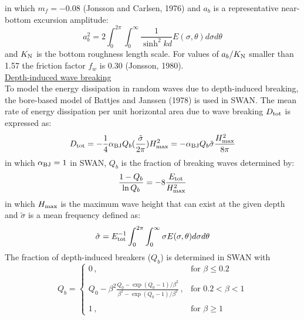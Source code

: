 \documentclass[12pt]{book}
\begin{document}
in which $m_f = -0.08$ (Jonsson and Carlsen, 1976) and $a_b$ is a representative near-bottom excursion
amplitude:
\begin{equation}
  a^2_{b} = 2\int_{0}^{2\pi} \int_{0}^{\infty} \frac{1}{\sinh^2 kd} E(\sigma,\theta) d\sigma d\theta
  \label{eq3-21}
\end{equation}
and $K_{\rm N}$ is the bottom roughness length scale. For values of $a_b/K_{\rm N}$ smaller than 1.57 the
friction factor $f_w$ is 0.30 (Jonsson, 1980).
\nocite{Jon76C,Jon80}
\\[2ex]
\noindent
\underline{Depth-induced wave breaking}\\[2ex]
To model the energy dissipation in random waves due to depth-induced breaking, the bore-based model
of Battjes and Janssen (1978) is used in SWAN. The mean rate of energy dissipation per unit horizontal
area due to wave breaking $D_{\rm tot}$ is expressed as:
\begin{equation}
  D_{\rm tot} = - \frac{1}{4} \alpha_{\rm BJ} Q_b (\frac{\tilde{\sigma}}{2\pi}) H^2_{\rm max}
              = - \alpha_{\rm BJ} Q_b \tilde{\sigma} \frac{H^2_{\rm max}}{8\pi}
  \label{eq3-22}
\end{equation}
in which $\alpha_{\rm BJ} = 1$ in SWAN, $Q_b$ is the fraction of breaking waves determined by:
\begin{equation}
  \frac{1 - Q_b}{\ln Q_b} = -8 \frac{E_{\rm tot}}{H_{\rm max}^2}
  \label{eq3-23}
\end{equation}
in which $H_{\rm max}$ is the maximum wave height that can exist at the given depth and ${\tilde{\sigma}}$
is a mean frequency defined as:
\begin{equation}
  \tilde{\sigma} = E^{-1}_{\rm tot} \int_{0}^{2\pi} \int_{0}^{\infty} \sigma E(\sigma,\theta) d\sigma d\theta
  \label{eq3-24}
\end{equation}
The fraction of depth-induced breakers ($Q_b$) is determined in SWAN with
\begin{equation}
   Q_b =
    \left\{
      \begin{array}{ll}
         0 \, , & \mbox{for } \beta \leq 0.2 \\
         \\
         Q_0 - \beta^2 \frac{Q_0 - \exp{(Q_0 - 1)/\beta^2}}{\beta^2 - \exp{(Q_0 - 1)/\beta^2}}
         \, , & \mbox{for }  0.2 < \beta < 1\\
         \\
         1 \, , & \mbox{for }  \beta \geq 1
      \end{array}
    \right.
  \label{eq3-25}
\end{equation}
\end{document}
